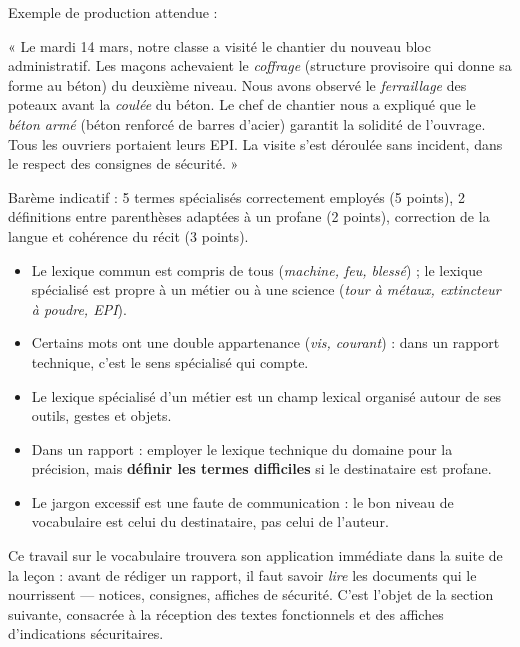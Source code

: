 \documentclass[11pt]{article}
\newcommand{\cle}[1]{{\popxbold\color{popdark}#1}}
\begin{document}
\begin{corrige}
Exemple de production attendue :

« Le mardi 14 mars, notre classe a visité le chantier du nouveau bloc administratif. Les maçons achevaient le \emph{coffrage} (structure provisoire qui donne sa forme au béton) du deuxième niveau. Nous avons observé le \emph{ferraillage} des poteaux avant la \emph{coulée} du béton. Le chef de chantier nous a expliqué que le \emph{béton armé} (béton renforcé de barres d'acier) garantit la solidité de l'ouvrage. Tous les ouvriers portaient leurs EPI. La visite s'est déroulée sans incident, dans le respect des consignes de sécurité. »

Barème indicatif : 5 termes spécialisés correctement employés (5 points), 2 définitions entre parenthèses adaptées à un profane (2 points), correction de la langue et cohérence du récit (3 points).
\end{corrige}

\begin{aretenir}
\begin{itemize}
\item Le \cle{lexique commun} est compris de tous (\emph{machine, feu, blessé}) ; le \cle{lexique spécialisé} est propre à un métier ou à une science (\emph{tour à métaux, extincteur à poudre, EPI}).
\item Certains mots ont une double appartenance (\emph{vis, courant}) : dans un rapport technique, c'est le sens spécialisé qui compte.
\item Le lexique spécialisé d'un métier est un champ lexical organisé autour de ses outils, gestes et objets.
\item Dans un rapport : employer le lexique technique du domaine pour la précision, mais \textbf{définir les termes difficiles} si le destinataire est profane.
\item Le jargon excessif est une faute de communication : le bon niveau de vocabulaire est celui du destinataire, pas celui de l'auteur.
\end{itemize}
\end{aretenir}

Ce travail sur le vocabulaire trouvera son application immédiate dans la suite de la leçon : avant de rédiger un rapport, il faut savoir \emph{lire} les documents qui le nourrissent — notices, consignes, affiches de sécurité. C'est l'objet de la section suivante, consacrée à la réception des textes fonctionnels et des affiches d'indications sécuritaires.
\end{document}

